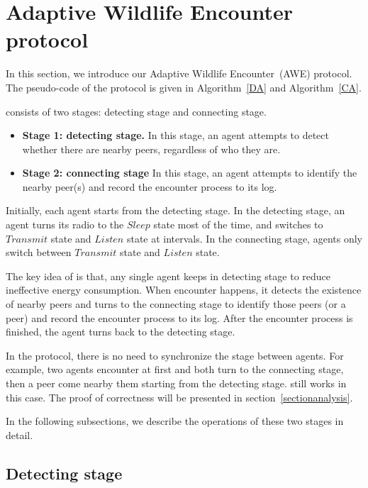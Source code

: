 \section{Adaptive Wildlife Encounter protocol}
\label{sectionmodel}

In this section, we introduce our Adaptive Wildlife Encounter~(AWE) protocol.
The pseudo-code of the protocol is given in Algorithm~\ref{DA} and Algorithm~\ref{CA}.

{\pName} consists of two stages: detecting stage and 
connecting stage. 
\begin{itemize}
    \item \textbf{Stage 1: detecting stage.} In this stage, an agent attempts to
    detect whether there are nearby peers, regardless of who they are. 
    \item \textbf{Stage 2: connecting stage} In this stage, an agent attempts to 
    identify the nearby peer(s) and record the encounter process to its log.
\end{itemize}

Initially, each agent starts from the detecting stage. 
In the detecting stage, an agent turns its radio to the $Sleep$ state most of the time,
and switches to $Transmit$ state and $Listen$ state at intervals.
In the connecting stage, agents only switch between $Transmit$ state 
and $Listen$ state.

The key idea of {\pName} is that, any single agent keeps in detecting 
stage to reduce ineffective energy consumption. When encounter happens, 
it detects the existence of nearby peers and turns to the connecting stage 
to identify those peers (or a peer) and record the encounter process to its log. 
After the encounter process is finished, the agent turns back to the detecting stage.

\begin{remark}
    In the {\pName} protocol, there is no need to synchronize the stage between agents.
    For example, two agents encounter at first and both turn to the connecting stage,
    then a peer come nearby them starting from the detecting stage. 
    {\pName} still works in this case. The proof of correctness will be presented 
    in section~\ref{sectionanalysis}. 
\end{remark}

In the following subsections, we describe the operations of these two stages in detail. 

\subsection{Detecting stage}

